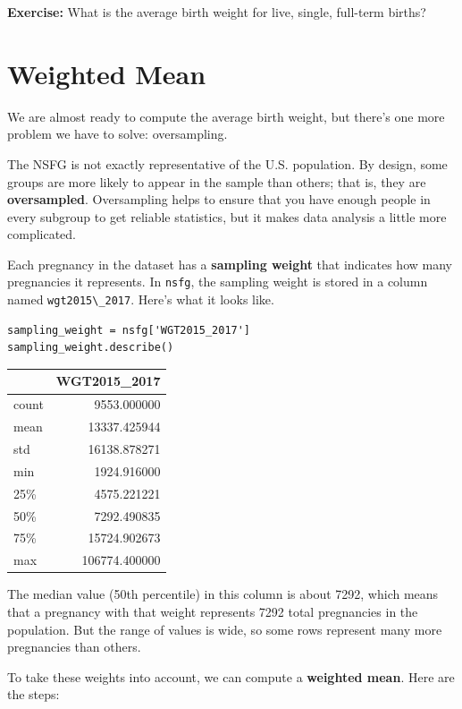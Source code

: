 \textbf{Exercise:} What is the average birth weight for live, single,
full-term births?

\hypertarget{weighted-mean}{%
\section{Weighted Mean}\label{weighted-mean}}

We are almost ready to compute the average birth weight, but there's one
more problem we have to solve: oversampling.

The NSFG is not exactly representative of the U.S. population. By
design, some groups are more likely to appear in the sample than others;
that is, they are \textbf{oversampled}. Oversampling helps to ensure
that you have enough people in every subgroup to get reliable
statistics, but it makes data analysis a little more complicated.

Each pregnancy in the dataset has a \textbf{sampling weight} that
indicates how many pregnancies it represents. In
\passthrough{\lstinline!nsfg!}, the sampling weight is stored in a
column named \passthrough{\lstinline!wgt2015\_2017!}. Here's what it
looks like.

\begin{lstlisting}[]
sampling_weight = nsfg['WGT2015_2017']
sampling_weight.describe()
\end{lstlisting}

\begin{tabular}{lr}
\midrule
{} &   WGT2015\_2017 \\
\midrule
count &    9553.000000 \\
mean  &   13337.425944 \\
std   &   16138.878271 \\
min   &    1924.916000 \\
25\%   &    4575.221221 \\
50\%   &    7292.490835 \\
75\%   &   15724.902673 \\
max   &  106774.400000 \\
\midrule
\end{tabular}

The median value (50th percentile) in this column is about 7292, which
means that a pregnancy with that weight represents 7292 total
pregnancies in the population. But the range of values is wide, so some
rows represent many more pregnancies than others.

To take these weights into account, we can compute a \textbf{weighted
mean}. Here are the steps:

